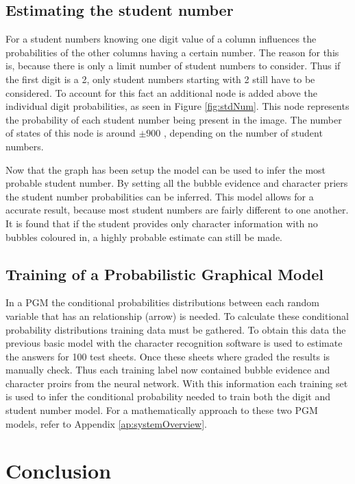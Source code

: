 \subsection{Estimating the student number}
\label{sec:studentNumber}

For a student numbers knowing one digit value of a column influences the probabilities of the other columns having a certain number. The reason for this is, because there is only a limit number of student numbers to consider. Thus if the first digit is a 2, only student numbers starting with 2 still have to be considered. To account for this fact an additional node is added above the individual digit probabilities, as seen in Figure \ref{fig:stdNum}. This node represents the probability of each student number being present in the image. The number of states of this node is around $\pm 900$ , depending on the number of student numbers.

Now that the graph has been setup the model can be used to infer the most probable student number. By setting all the bubble evidence and character priers the student number probabilities can be inferred. This model allows for a accurate result, because most student numbers are fairly different to one another. It is found that if the student provides only character information with no bubbles coloured in, a highly probable estimate can still be made.

\subsection{Training of a Probabilistic Graphical Model}
In a PGM the conditional probabilities distributions between each random variable that has an relationship (arrow) is needed. 
To calculate these conditional probability distributions training data must be gathered. To obtain this  data the previous basic model with the character recognition software is used to estimate the answers for 100 test sheets. Once these sheets where graded the results is manually check. Thus each training label now contained bubble evidence and character proirs from the neural network. With this information each training set is used to infer the conditional probability needed to train both the digit and student number model. For a mathematically approach to these two PGM models, refer to Appendix \ref{ap:systemOverview}.

\section{Conclusion}

